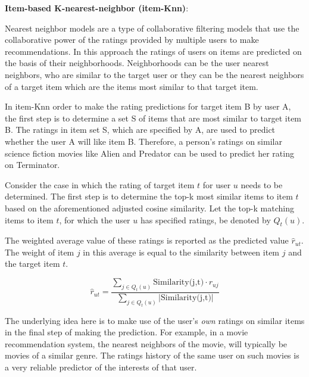         
        \textbf{Item-based K-nearest-neighbor (item-Knn)}: 
        
        Nearest neighbor models are a type of collaborative filtering models that use the collaborative power of the ratings provided by multiple users to make recommendations. In this approach the ratings of users on items are predicted on the basis of their neighborhoods. Neighborhoods can be the user nearest neighbors, who are similar to the target user or they can be the nearest neighbors of a target item which are the items most similar to that target item.
        
        In item-Knn order to make the rating predictions for target item B by user A, the first step is to determine a set S of items that are most similar to target item B. The ratings in item set S, which are specified by A, are used to predict whether the user A will like item B. Therefore, a person's ratings on similar science fiction movies like Alien and Predator can be used to predict her rating on Terminator.
    
        
        
        Consider the case in which the rating of target item $t$ for user $u$ needs to be determined. The first step is to determine the top-k most similar items to item $t$ based on the aforementioned adjusted cosine similarity. Let the top-k matching items to item $t$, for which the user $u$ has specified ratings, be denoted by $Q_{t}(u)$.

        The weighted average value of these ratings is reported as the predicted value $\hat{r}_{ut}$. The weight of item $j$ in this average is equal to the similarity between item $j$ and the target item $t$. 
        
        \begin{equation}
            \hat{r}_{ut} = \frac{\sum_{j \in Q_{t}(u)} \text{Similarity(j,t)} \cdot r_{uj}}{\sum_{j \in Q_{t}(u)} |\text{Similarity(j,t)}|}
        \end{equation}
        
        The underlying idea here is to make use of the user’s \textit{own} ratings on similar items in the final step of making the prediction. For example, in a movie recommendation system, the nearest neighbors of the movie, will typically be movies of a similar genre. The ratings history of the same user on such movies is a very reliable predictor of the interests of that user.
        
